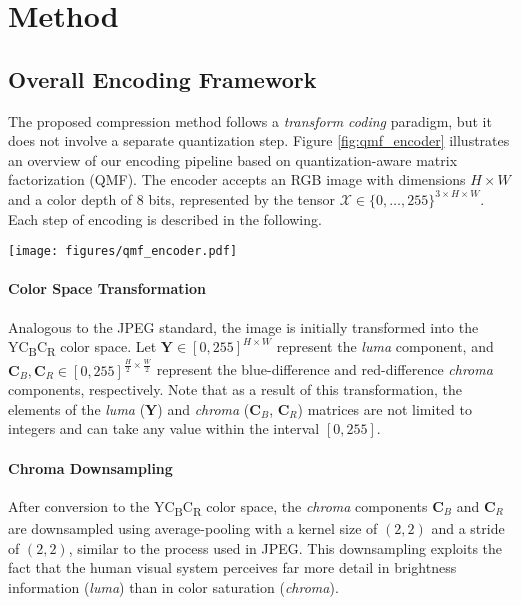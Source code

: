 \section{Method} \label{sec:method}


\subsection{Overall Encoding Framework} \label{sec:overall_framework}

The proposed compression method follows a \emph{transform coding} paradigm, but it does not involve a separate quantization step. Figure \ref{fig:qmf_encoder} illustrates an overview of our encoding pipeline based on quantization-aware matrix factorization (QMF). The encoder accepts an RGB image with dimensions $H \times W$ and a color depth of 8 bits, represented by the tensor $\bm{\mathcal{X}} \in \{0, \ldots, 255\}^{3 \times H \times W}$. Each step of encoding is described in the following.

\begin{figure*}[!t]
    \centering
    \texttt{[image: figures/qmf\_encoder.pdf]}
    \caption{An illustration of the encoder for our image compression method.}
    \label{fig:qmf_encoder}
\end{figure*}

\paragraph{Color Space Transformation}
Analogous to the JPEG standard, the image is initially transformed into the YC\textsubscript{B}C\textsubscript{R} color space. Let $\bm{Y} \in [0, 255]^{H \times W}$ represent the \emph{luma} component, and $\bm{C}_B, \bm{C}_R \in [0, 255]^{\frac{H}{2} \times \frac{W}{2}}$ represent the blue-difference and red-difference \emph{chroma} components, respectively. Note that as a result of this transformation, the elements of the \emph{luma} ($\bm{Y}$) and \emph{chroma} ($\bm{C}_B$, $\bm{C}_R$) matrices are not limited to integers and can take any value within the interval $[0, 255]$.

\paragraph{Chroma Downsampling}
After conversion to the YC\textsubscript{B}C\textsubscript{R} color space, the \emph{chroma} components $\bm{C}_B$ and $\bm{C}_R$ are downsampled using average-pooling with a kernel size of $(2, 2)$ and a stride of $(2, 2)$, similar to the process used in JPEG. This downsampling exploits the fact that the human visual system perceives far more detail in brightness information (\emph{luma}) than in color saturation (\emph{chroma}).

